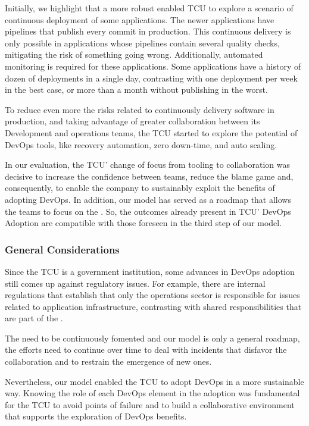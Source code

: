 Initially, we highlight that a more robust \cc enabled TCU to explore a scenario
of continuous deployment of some applications. The newer applications have
pipelines that publish every commit in production. This continuous delivery is
only possible in applications whose pipelines contain several quality checks,
mitigating the risk of something going wrong. Additionally, automated monitoring
is required for these applications. Some applications have a history of dozen
of deployments in a single day, contrasting with one deployment per week in the
best case, or more than a month without publishing in the worst.

To reduce even more the risks related to continuously delivery software in
production, and taking advantage of greater collaboration between its Development
and operations teams, the TCU started to explore the potential of DevOps tools,
like recovery automation, zero down-time, and auto scaling.

In our evaluation, the TCU' change of focus from tooling to collaboration was
decisive to increase the confidence between teams, reduce the blame game and,
consequently, to enable the company to sustainably exploit the benefits of
adopting DevOps. In addition, our model has served as a roadmap that allows
the teams to focus on the \cc. So, the outcomes already present in TCU' DevOps
Adoption are compatible with those foreseen in the third step of our model.

\subsubsection{General Considerations}
Since the TCU is a government institution, some advances in DevOps adoption
still comes up against regulatory issues. For example, there are internal
regulations that establish that only the operations sector is responsible for
issues related to application infrastructure, contrasting with shared
responsibilities that are part of the \cc.

{
\color{blue}
The \cc need to be continuously fomented and our model is only a general roadmap,
the efforts need to continue over time to deal with incidents that disfavor
the collaboration and to restrain the emergence of new ones.
}

Nevertheless, our model enabled the TCU to adopt DevOps in a more sustainable
way. Knowing the role of each DevOps element in the adoption was fundamental for
the TCU to avoid points of failure and to build a collaborative environment that
supports the exploration of DevOps benefits.

